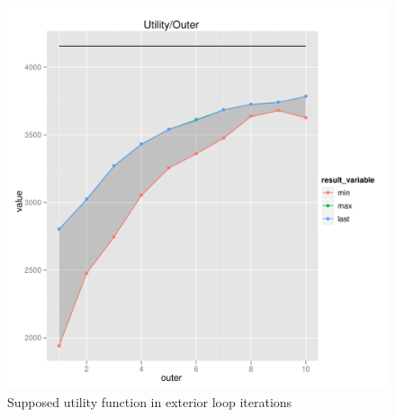 \begin{figure}[tb]
  \centering \includegraphics[width=1.0\textwidth]{exp/nouncert/c2_utilouter}
  \caption{Supposed utility function in exterior loop iterations}
  \label{c2_utilouter}
\end{figure}




